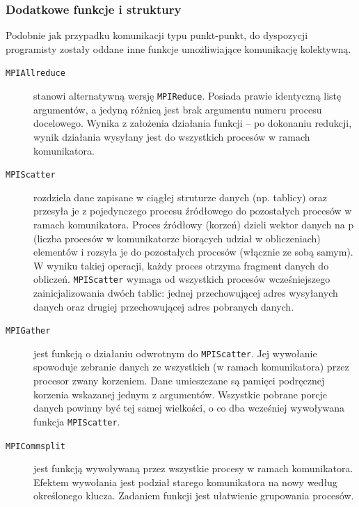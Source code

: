 \subsubsection{Dodatkowe funkcje i struktury}

Podobnie jak przypadku komunikacji typu punkt-punkt, do dyspozycji programisty zostały oddane inne funkcje umożliwiające komunikację kolektywną.

\begin{description}
	\item[\texttt{MPI\textunderscore Allreduce}] stanowi alternatywną wersję \texttt{MPI\textunderscore Reduce}. Posiada prawie identyczną listę argumentów, a jedyną różnicą jest brak argumentu numeru procesu docelowego. Wynika z założenia działania funkcji -- po dokonaniu redukcji, wynik działania wysyłany jest do wszystkich procesów w ramach komunikatora.
	\item[\texttt{MPI\textunderscore Scatter}] rozdziela dane zapisane w ciągłej struturze danych (np. tablicy) oraz przesyła je z pojedynczego procesu źródłowego do pozostałych procesów w ramach komunikatora. Proces źródłowy (korzeń) dzieli wektor danych na p (liczba procesów w komunikatorze biorących udział w obliczeniach) elementów i rozsyła je do pozostałych procesów (włącznie ze sobą samym). W wyniku takiej operacji, każdy proces otrzyma fragment danych do obliczeń. \texttt{MPI\textunderscore Scatter} wymaga od wszystkich procesów wcześniejszego zainicjalizowania dwóch tablic: jednej przechowującej adres wysyłanych danych oraz drugiej przechowującej adres pobranych danych.
	\item[\texttt{MPI\textunderscore Gather}] jest funkcją o działaniu odwrotnym do \texttt{MPI\textunderscore Scatter}. Jej wywołanie spowoduje zebranie danych ze wszystkich (w ramach komunikatora) przez procesor zwany korzeniem. Dane umieszczane są pamięci podręcznej korzenia wskazanej jednym z argumentów. Wszystkie pobrane porcje danych powinny być tej samej wielkości, o co dba wcześniej wywoływana funkcja \texttt{MPI\textunderscore Scatter}.
	\item[\texttt{MPI\textunderscore Comm\textunderscore split}] jest funkcją wywoływaną przez wszystkie procesy w ramach komunikatora. Efektem wywołania jest podział starego komunikatora na nowy według określonego klucza. Zadaniem funkcji jest ułatwienie grupowania procesów.
\end{description}
